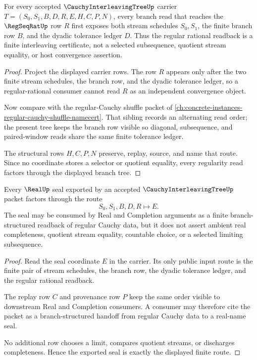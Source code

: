 \begin{theorem}
\label{thm:cauchy-interleaving-tree-regularity}
For every accepted $\CauchyInterleavingTreeUp$ carrier $T=(S_0,S_1,B,D,R,E,H,C,P,N)$, every branch read that reaches the $\RegSeqRatUp$ row $R$ first exposes both stream schedules $S_0,S_1$, the finite branch row $B$, and the dyadic tolerance ledger $D$. Thus the regular rational readback is a finite interleaving certificate, not a selected subsequence, quotient stream equality, or host convergence assertion.
\end{theorem}
\begin{proof}
Project the displayed carrier rows. The row $R$ appears only after the two finite stream schedules, the branch row, and the dyadic tolerance ledger, so a regular-rational consumer cannot read $R$ as an independent convergence object.

Now compare with the regular-Cauchy shuffle packet of \autoref{ch:concrete-instances-regular-cauchy-shuffle-namecert}. That sibling records an alternating read order; the present tree keeps the branch row visible so diagonal, subsequence, and paired-window reads share the same finite tolerance ledger.

The structural rows $H,C,P,N$ preserve, replay, source, and name that route. Since no coordinate stores a selector or quotient equality, every regularity read factors through the displayed branch tree.
\end{proof}

\begin{theorem}
\label{thm:cauchy-interleaving-tree-real-seal}
Every $\RealUp$ seal exported by an accepted $\CauchyInterleavingTreeUp$ packet factors through the route
$$
S_0,S_1,B,D,R \longmapsto E .
$$
The seal may be consumed by Real and Completion arguments as a finite branch-structured readback of regular Cauchy data, but it does not assert ambient real completeness, quotient stream equality, countable choice, or a selected limiting subsequence.
\end{theorem}
\begin{proof}
Read the seal coordinate $E$ in the carrier. Its only public input route is the finite pair of stream schedules, the branch row, the dyadic tolerance ledger, and the regular rational readback.

The replay row $C$ and provenance row $P$ keep the same order visible to downstream Real and Completion consumers. A consumer may therefore cite the packet as a branch-structured handoff from regular Cauchy data to a real-name seal.

No additional row chooses a limit, compares quotient streams, or discharges completeness. Hence the exported seal is exactly the displayed finite route.
\end{proof}

